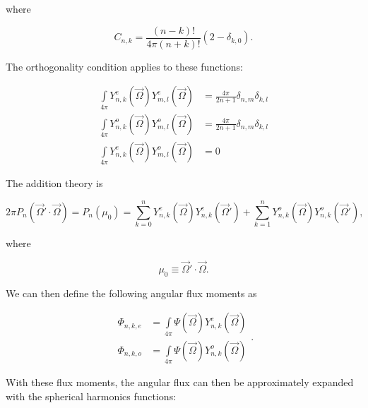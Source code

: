 \noindent where

\begin{equation}
\label{eq::App_SN_sharm_consts}
C_{n,k} = \frac{(n-k)!}{4 \pi (n+k) !}( 2-  \delta_{k,0}).
\end{equation}

\noindent The orthogonality condition applies to these functions:

\begin{equation}
\label{eq::App_SN_sharm_orth}
\begin{aligned}
\int\limits_{4 \pi} Y^e_{n,k} (\vec{\Omega}) Y^e_{m,l} (\vec{\Omega}) &= \frac{4 \pi}{2n+1} \delta_{n,m} \delta_{k,l} \\ 
\int\limits_{4 \pi} Y^o_{n,k} (\vec{\Omega}) Y^o_{m,l} (\vec{\Omega}) &= \frac{4 \pi}{2n+1} \delta_{n,m} \delta_{k,l} \\ 
\int\limits_{4 \pi} Y^e_{n,k} (\vec{\Omega}) Y^o_{m,l} (\vec{\Omega}) &= 0
\end{aligned} 
\end{equation}

\noindent The addition theory is

\begin{equation}
\label{eq::App_SN_sharm_addition}
2 \pi P_n (\vec{\Omega}' \cdot \vec{\Omega}) = P_n (\mu_0) = \sum_{k=0}^{n} Y^e_{n,k} (\vec{\Omega}) Y^e_{n,k} (\vec{\Omega}') + \sum_{k=1}^{n} Y^o_{n,k} (\vec{\Omega}) Y^o_{n,k} (\vec{\Omega}') ,
\end{equation}

\noindent where

\begin{equation}
\label{eq::App_SN_mu_to_omegas}
\mu_0 \equiv \vec{\Omega}' \cdot \vec{\Omega} .
\end{equation}

\noindent We can then define the following angular flux moments as

\begin{equation}
\label{eq::App_SN_sharm_fluxmom}
\begin{aligned}
\Phi_{n,k,e} &=\int\limits_{4 \pi}\Psi (\vec{\Omega})  Y^e_{n,k} (\vec{\Omega})   \\ 
\Phi_{n,k,o} &=\int\limits_{4 \pi}\Psi (\vec{\Omega}) Y^o_{n,k} (\vec{\Omega}) 
\end{aligned} .
\end{equation}

\noindent With these flux moments, the angular flux can then be approximately expanded with the spherical harmonics functions:

